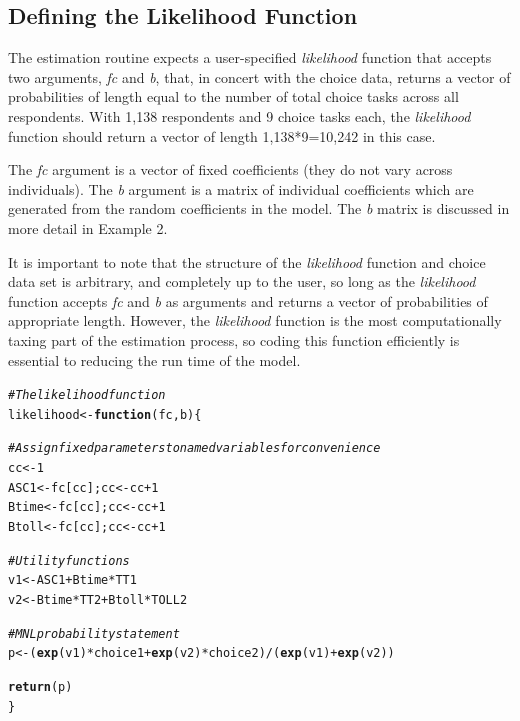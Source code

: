 \documentclass{article}\usepackage[]{graphicx}\usepackage[]{color}
\makeatletter
\newcommand{\hlnum}[1]{\textcolor[rgb]{0.686,0.059,0.569}{#1}}%
\newcommand{\hlcom}[1]{\textcolor[rgb]{0.678,0.584,0.686}{\textit{#1}}}%
\newcommand{\hlopt}[1]{\textcolor[rgb]{0,0,0}{#1}}%
\newcommand{\hlstd}[1]{\textcolor[rgb]{0.345,0.345,0.345}{#1}}%
\newcommand{\hlkwa}[1]{\textcolor[rgb]{0.161,0.373,0.58}{\textbf{#1}}}%
\newcommand{\hlkwb}[1]{\textcolor[rgb]{0.69,0.353,0.396}{#1}}%
\newcommand{\hlkwc}[1]{\textcolor[rgb]{0.333,0.667,0.333}{#1}}%
\newcommand{\hlkwd}[1]{\textcolor[rgb]{0.737,0.353,0.396}{\textbf{#1}}}%
\newenvironment{kframe}{%
 \def\at@end@of@kframe{}%
 \ifinner\ifhmode%
  \def\at@end@of@kframe{\end{minipage}}%
  \begin{minipage}{\columnwidth}%
 \fi\fi%
 \def\FrameCommand##1{\hskip\@totalleftmargin \hskip-\fboxsep
 \colorbox{shadecolor}{##1}\hskip-\fboxsep
     \hskip-\linewidth \hskip-\@totalleftmargin \hskip\columnwidth}%
 \MakeFramed {\advance\hsize-\width
   \@totalleftmargin\z@ \linewidth\hsize
   \@setminipage}}%
 {\par\unskip\endMakeFramed%
 \at@end@of@kframe}
\newenvironment{knitrout}{}{} %
\makeatother
\begin{document}
\subsection*{Defining the Likelihood Function}

The estimation routine expects a user-specified \emph{likelihood} function that accepts two arguments, \emph{fc} and \emph{b}, that, in concert with the choice data, returns a vector of probabilities of length equal to the number of total choice tasks across all respondents. With 1,138 respondents and 9 choice tasks each, the \emph{likelihood} function should return a vector of length 1,138*9=10,242 in this case.

The \emph{fc} argument is a vector of fixed coefficients (they do not vary across individuals). The \emph{b} argument is a matrix of individual coefficients which are generated from the random coefficients in the model. The \emph{b} matrix is discussed in more detail in Example 2.

It is important to note that the structure of the \emph{likelihood} function and choice data set is arbitrary, and completely up to the user, so long as the \emph{likelihood} function accepts \emph{fc} and \emph{b} as arguments and returns a vector of probabilities of appropriate length. However, the \emph{likelihood} function is the most computationally taxing part of the estimation process, so coding this function efficiently is essential to reducing the run time of the model.

\begin{knitrout}
\color{fgcolor}\begin{kframe}
\begin{alltt}
\hlcom{# The likelihood function}
\hlstd{likelihood} \hlkwb{<-} \hlkwa{function}\hlstd{(}\hlkwc{fc}\hlstd{,} \hlkwc{b}\hlstd{) \{}

  \hlcom{# Assign fixed parameters to named variables for convenience    }
  \hlstd{cc} \hlkwb{<-} \hlnum{1}
  \hlstd{ASC1}  \hlkwb{<-} \hlstd{fc[cc]; cc} \hlkwb{<-} \hlstd{cc} \hlopt{+} \hlnum{1}
  \hlstd{Btime} \hlkwb{<-} \hlstd{fc[cc]; cc} \hlkwb{<-} \hlstd{cc} \hlopt{+} \hlnum{1}
  \hlstd{Btoll} \hlkwb{<-} \hlstd{fc[cc]; cc} \hlkwb{<-} \hlstd{cc} \hlopt{+} \hlnum{1}

  \hlcom{# Utility functions}
  \hlstd{v1} \hlkwb{<-} \hlstd{ASC1} \hlopt{+} \hlstd{Btime} \hlopt{*} \hlstd{TT1}
  \hlstd{v2} \hlkwb{<-}        \hlstd{Btime} \hlopt{*} \hlstd{TT2} \hlopt{+} \hlstd{Btoll} \hlopt{*} \hlstd{TOLL2}

  \hlcom{# MNL probability statement}
  \hlstd{p}  \hlkwb{<-} \hlstd{(}\hlkwd{exp}\hlstd{(v1)} \hlopt{*} \hlstd{choice1} \hlopt{+} \hlkwd{exp}\hlstd{(v2)} \hlopt{*} \hlstd{choice2)} \hlopt{/} \hlstd{(}\hlkwd{exp}\hlstd{(v1)} \hlopt{+} \hlkwd{exp}\hlstd{(v2))}

  \hlkwd{return}\hlstd{(p)}
\hlstd{\}}
\end{alltt}
\end{kframe}
\end{knitrout}
\end{document}
